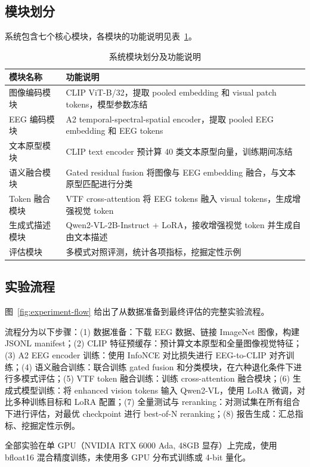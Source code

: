 \subsection{模块划分}

系统包含七个核心模块，各模块的功能说明见表~\ref{tab:modules}。

\begin{table}[htbp]
  \centering
  \caption{系统模块划分及功能说明}
  \label{tab:modules}
  \begin{tabularx}{\linewidth}{l X}
    \toprule
    模块名称 & 功能说明 \\
    \midrule
    图像编码模块 & CLIP ViT-B/32，提取 pooled embedding 和 visual patch tokens，模型参数冻结 \\
    EEG 编码模块 & A2 temporal-spectral-spatial encoder，提取 pooled EEG embedding 和 EEG tokens \\
    文本原型模块 & CLIP text encoder 预计算 40 类文本原型向量，训练期间冻结 \\
    语义融合模块 & Gated residual fusion 将图像与 EEG embedding 融合，与文本原型匹配进行分类 \\
    Token 融合模块 & VTF cross-attention 将 EEG tokens 融入 visual tokens，生成增强视觉 token \\
    生成式描述模块 & Qwen2-VL-2B-Instruct + LoRA，接收增强视觉 token 并生成自由文本描述 \\
    评估模块 & 多模式对照评测，统计各项指标，挖掘定性示例 \\
    \bottomrule
  \end{tabularx}
\end{table}

\subsection{实验流程}

图~\ref{fig:experiment-flow} 给出了从数据准备到最终评估的完整实验流程。


流程分为以下步骤：(1) 数据准备：下载 EEG 数据、链接 ImageNet 图像，构建 JSONL manifest；(2) CLIP 特征预缓存：预计算文本原型和全量图像视觉特征；(3) A2 EEG encoder 训练：使用 InfoNCE 对比损失进行 EEG-to-CLIP 对齐训练；(4) 语义融合训练：联合训练 gated fusion 和分类模块，在六种退化条件下进行多模式评估；(5) VTF token 融合训练：训练 cross-attention 融合模块；(6) 生成式模型训练：将 enhanced vision tokens 输入 Qwen2-VL，使用 LoRA 微调，对比多种训练目标和 LoRA 配置；(7) 全量测试与 reranking：对测试集在所有组合下进行评估，对最优 checkpoint 进行 best-of-N reranking；(8) 报告生成：汇总指标、挖掘定性示例。

全部实验在单 GPU（NVIDIA RTX 6000 Ada, 48GB 显存）上完成，使用 bfloat16 混合精度训练，未使用多 GPU 分布式训练或 4-bit 量化。
